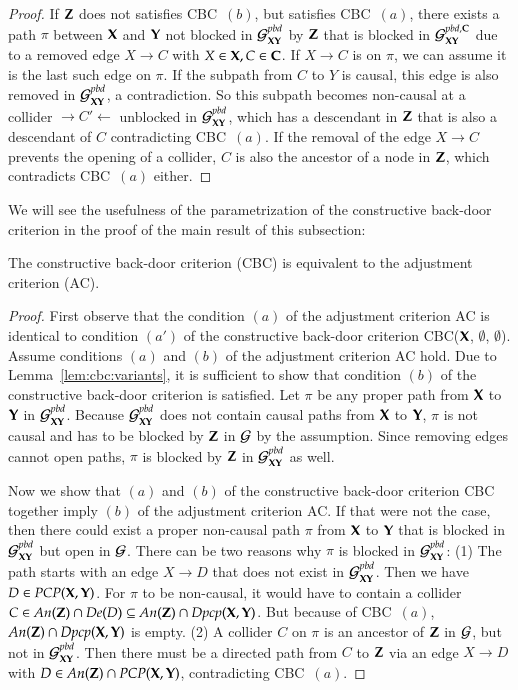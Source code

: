 \begin{proof}
If $ {\bf Z} $ does not satisfies CBC~$(b)$, but satisfies CBC~$(a)$, there exists a path $ \pi $ between ${\bf X} $ and $ {\bf Y} $ not blocked in $ {\cal G}^{pbd}_{{\bf X}{\bf Y}} $ by $ {\bf Z} $ that is blocked in $ {\cal G}^{pbd,{\bf C}}_{{\bf X}{\bf Y}} $ due to a removed edge $ X \to C $ with $ X \in {\bf X}, C\in {\bf C} $. 
If $ X \to C $ is on $ \pi $, we can assume it is the last such edge on $ \pi $. If the subpath from $ C $ to $ Y $ is causal, this edge is also removed in $ {\cal G}^{pbd}_{{\bf X}{\bf Y}} $, a contradiction. So this subpath becomes non-causal at a  collider $ \to C' \gets $ unblocked in $ {\cal G}^{pbd}_{{\bf X}{\bf Y}} $, which has a descendant in ${\bf Z}$ that is also a descendant of $ C $ contradicting CBC~$(a)$. 
If the removal of the edge  $X \to C $ prevents the opening of a collider, $ C $ is also the ancestor of a node in $ {\bf Z} $, which contradicts CBC~$(a)$ either.
\end{proof}

We will see the usefulness of the parametrization of the constructive back-door criterion
in the proof of the main result of this subsection:

\begin{theorem}\label{th:ac:equivalence}
The constructive back-door criterion (CBC) is equivalent to the adjustment criterion (AC).
\end{theorem}

\begin{proof}
First observe that the condition $(a)$ of the adjustment criterion AC is identical to condition $(a')$ 
of the constructive back-door criterion CBC($ {\bf X} $, $ \emptyset $, $\emptyset$).
%
Assume conditions $(a)$ and $(b)$ of the adjustment criterion AC hold. 
Due to Lemma~\ref{lem:cbc:variants}, it is sufficient to 
show that condition $(b)$ of the constructive back-door criterion is satisfied.
%
Let $\pi$ be any proper path from ${\bf X}$ to ${\bf Y}$ in ${\cal G}^{pbd}_{{\bf X}{\bf Y}}$. 
Because ${\cal G}^{pbd}_{{\bf X}{\bf Y}}$ does not contain causal 
paths from ${\bf X}$ to ${\bf Y}$, $\pi$ is not causal
and has to be blocked by ${\bf Z}$
in ${\cal G}$ by the assumption. Since removing edges cannot
open paths, $\pi$ is blocked by ${\bf Z}$ in ${\cal G}^{pbd}_{{\bf X}{\bf Y}}$ 
as well.

Now we show that $(a)$ and $(b)$ of the
constructive back-door criterion CBC together 
imply $(b)$ of the adjustment criterion AC.
If that were not the case, then there could exist  a proper 
non-causal path $\pi$ from ${\bf X}$ to ${\bf Y}$ that is blocked in ${\cal G}^{pbd}_{{\bf X}{\bf Y}}$ but open
in ${\cal G}$. There can be two reasons why $\pi$ is blocked 
in ${\cal G}^{pbd}_{{\bf X}{\bf Y}}$: (1) The path starts with an edge $X \to D$ that does not exist
in ${\cal G}^{pbd}_{{\bf X}{\bf Y}}$. Then we have $D \in \textit{PCP}({\bf X},{\bf Y})$. For $\pi$
to be non-causal, it would have to contain a collider 
$C \in \textit{An}({\bf Z}) \cap \textit{De}(D) \subseteq
\textit{An}({\bf Z}) \cap \textit{Dpcp}({\bf X},{\bf Y})$. But because of 
CBC~$(a)$, $\textit{An}({\bf Z}) \cap \textit{Dpcp}({\bf X},{\bf Y})$ is empty.
(2) A collider $C$ on $\pi$ is an ancestor of ${\bf Z}$ 
in ${\cal G}$, but not in ${\cal G}^{pbd}_{{\bf X}{\bf Y}}$. Then there must be a directed path
from $C$ to ${\bf Z}$ via an edge $X \to D$ with 
$D \in \textit{An}({\bf Z}) \cap \textit{PCP}({\bf X},{\bf Y}) $, contradicting CBC~$(a)$.
\end{proof}

